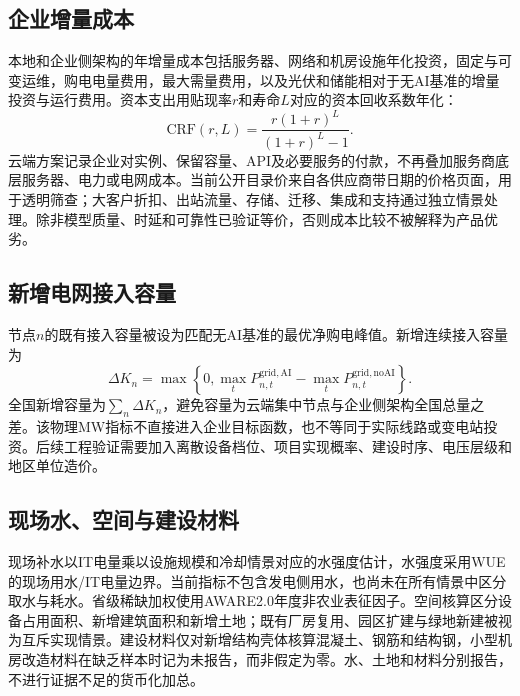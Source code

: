 \documentclass[preprint,12pt]{elsarticle}
\begin{document}
\subsection*{企业增量成本}

本地和企业侧架构的年增量成本包括服务器、网络和机房设施年化投资，固定与可变运维，购电电量费用，最大需量费用，以及光伏和储能相对于无AI基准的增量投资与运行费用。资本支出用贴现率$r$和寿命$L$对应的资本回收系数年化：
\begin{equation}
\mathrm{CRF}(r,L)=\frac{r(1+r)^L}{(1+r)^L-1}.
\end{equation}
云端方案记录企业对实例、保留容量、API及必要服务的付款，不再叠加服务商底层服务器、电力或电网成本。当前公开目录价来自各供应商带日期的价格页面，用于透明筛查\citep{AlibabaCloud2026ModelPricing,DeepSeek2026APIPricing,OpenAI2026APIPricing,Anthropic2026ClaudePricing,Google2026GeminiPricing}；大客户折扣、出站流量、存储、迁移、集成和支持通过独立情景处理。除非模型质量、时延和可靠性已验证等价，否则成本比较不被解释为产品优劣。

\subsection*{新增电网接入容量}

节点$n$的既有接入容量被设为匹配无AI基准的最优净购电峰值。新增连续接入容量为
\begin{equation}
\Delta K_n=\max\left\{0,\max_t P^{\mathrm{grid,AI}}_{n,t}
-\max_t P^{\mathrm{grid,noAI}}_{n,t}\right\}.
\end{equation}
全国新增容量为$\sum_n\Delta K_n$，避免容量为云端集中节点与企业侧架构全国总量之差。该物理MW指标不直接进入企业目标函数，也不等同于实际线路或变电站投资。后续工程验证需要加入离散设备档位、项目实现概率、建设时序、电压层级和地区单位造价。

\subsection*{现场水、空间与建设材料}

现场补水以IT电量乘以设施规模和冷却情景对应的水强度估计，水强度采用WUE的现场用水/IT电量边界\citep{Mytton2021DataCentreWater}。当前指标不包含发电侧用水，也尚未在所有情景中区分取水与耗水。省级稀缺加权使用AWARE2.0年度非农业表征因子\citep{Seitfudem2025AWARE2}。空间核算区分设备占用面积、新增建筑面积和新增土地；既有厂房复用、园区扩建与绿地新建被视为互斥实现情景。建设材料仅对新增结构壳体核算混凝土、钢筋和结构钢，小型机房改造材料在缺乏样本时记为未报告，而非假定为零。水、土地和材料分别报告，不进行证据不足的货币化加总。
\end{document}
